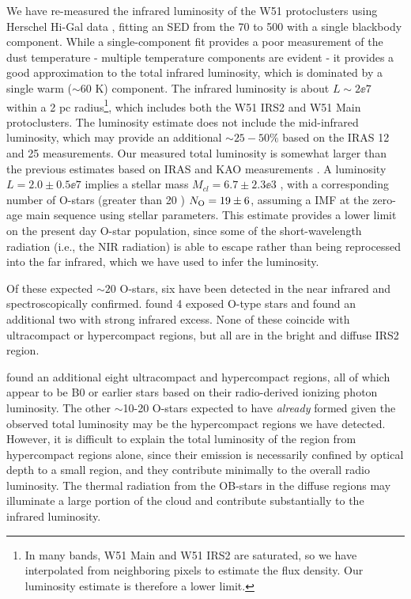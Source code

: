 We have re-measured the infrared luminosity of the W51 protoclusters using Herschel
Hi-Gal data \citep{Molinari2010a,Traficante2011a,Molinari2016a}, fitting an SED from the 70
to 500 \um with a single blackbody component.
While a single-component fit provides a poor
measurement of the dust temperature - multiple temperature components are
evident \citep{Sievers1991a} - it provides a good approximation to the total
infrared luminosity, which is dominated by a single warm ($\sim60$ K)
component.  The infrared luminosity is about $L\sim2\ee{7}$ \lsun within a 2 pc
radius\footnote{In many bands, W51 Main and W51 IRS2 are
saturated, so we have interpolated from neighboring pixels to estimate the flux
density.
Our luminosity estimate is therefore a lower limit.}, which includes
both the W51 IRS2 and W51 Main protoclusters.  The luminosity estimate does not
include the mid-infrared luminosity, which may provide an additional
$\sim25-50\%$ based on
the IRAS 12 and 25 \um measurements.  Our measured total luminosity is somewhat
larger than the previous estimates based on IRAS and KAO measurements
\citep{Harvey1986a,Sievers1991a}.
A luminosity $L=2.0\pm0.5\ee{7}$ \lsun implies
a stellar mass $M_{cl} = 6.7 \pm 2.3\ee{3}$ \msun, with a corresponding number of
O-stars (greater than 20 \msun) $N_{\rm O} = 19 \pm 6$, assuming a
\citet{Kroupa2001a} IMF at the zero-age main sequence using \citet{Vacca1996a}
stellar parameters.  This estimate provides a lower limit on the present day
O-star population, since some of the short-wavelength radiation (i.e., the NIR
radiation) is able to escape rather than being reprocessed into the far
infrared, which we have used to infer the luminosity.

Of these expected $\sim20$ O-stars, six have been detected in the near infrared
and spectroscopically confirmed.  \citet{Figueredo2008a} found 4 exposed O-type
stars and \citet{Barbosa2008a} found an additional two with strong infrared
excess.  None of these coincide with ultracompact or hypercompact \hii regions,
but all are in the bright and diffuse IRS2 \hii region.

\citet{Mehringer1994a} found an additional eight ultracompact and hypercompact
\hii regions, all of which appear to be B0 or earlier stars based on their
radio-derived ionizing photon luminosity.  The other $\sim$10-20 O-stars
expected to have \emph{already} formed given the observed total luminosity may
be the hypercompact \hii regions we have detected.  However, it is difficult to
explain the total luminosity of the region from hypercompact \hii regions
alone, since their emission is necessarily confined by optical depth to a small
region, and they contribute minimally to the overall radio luminosity.  The
thermal radiation from the OB-stars in the diffuse \hii regions may illuminate
a large portion of the cloud and contribute substantially to the infrared
luminosity.

